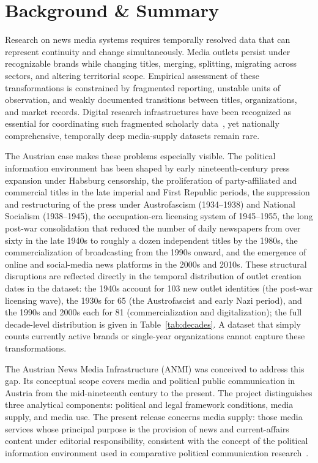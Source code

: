 \documentclass[11pt]{article}
\begin{document}
\section{Background \& Summary}

Research on news media systems requires temporally resolved data that can represent continuity and change simultaneously. Media outlets persist under recognizable brands while changing titles, merging, splitting, migrating across sectors, and altering territorial scope. Empirical assessment of these transformations is constrained by fragmented reporting, unstable units of observation, and weakly documented transitions between titles, organizations, and market records. Digital research infrastructures have been recognized as essential for coordinating such fragmented scholarly data~\cite{Strippel2021}, yet nationally comprehensive, temporally deep media-supply datasets remain rare.

The Austrian case makes these problems especially visible. The political information environment has been shaped by early nineteenth-century press expansion under Habsburg censorship, the proliferation of party-affiliated and commercial titles in the late imperial and First Republic periods, the suppression and restructuring of the press under Austrofascism (1934--1938) and National Socialism (1938--1945), the occupation-era licensing system of 1945--1955, the long post-war consolidation that reduced the number of daily newspapers from over sixty in the late 1940s to roughly a dozen independent titles by the 1980s, the commercialization of broadcasting from the 1990s onward, and the emergence of online and social-media news platforms in the 2000s and 2010s. These structural disruptions are reflected directly in the temporal distribution of outlet creation dates in the dataset: the 1940s account for 103 new outlet identities (the post-war licensing wave), the 1930s for 65 (the Austrofascist and early Nazi period), and the 1990s and 2000s each for 81 (commercialization and digitalization); the full decade-level distribution is given in Table~\ref{tab:decades}. A dataset that simply counts currently active brands or single-year organizations cannot capture these transformations.

The Austrian News Media Infrastructure (ANMI) was conceived to address this gap. Its conceptual scope covers media and political public communication in Austria from the mid-nineteenth century to the present. The project distinguishes three analytical components: political and legal framework conditions, media supply, and media use. The present release concerns media supply: those media services whose principal purpose is the provision of news and current-affairs content under editorial responsibility, consistent with the concept of the political information environment used in comparative political communication research~\cite{VanAelst2017,WilliamsDelliCarpini2011}.
\end{document}

